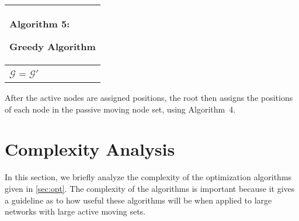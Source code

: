 \documentclass[10pt,conference]{IEEEtran}
\begin{document}
\begin{algorithm}[t]

\begin{tabular}[c]{p{8cm}}


\hline
{\scriptsize \begin{bf}Algorithm 5: \end{bf} Greedy Algorithm }\\
\hline

{\scriptsize
\KwIn{
Non-moving node subgraph, $\mathcal{G}'=
    \{\mathcal{V}',\mathcal{E}'\}$; active moving node set \AM;
    initial graph $\mathcal{G}_{i}$
}

\SetKwFunction{AN}{AttachNode}
\SetKwFunction{AT}{AggregateTraffic}

$\mathcal{G}$ = $\mathcal{G}'$\;

\While{$\AM  \neq \emptyset$}{
  $T_{\min}=\infty$\;
  \ForEach{$u \in \AM$} {

\ForEach{$v \in \mathcal{V}_{G}$}{

$\mathcal{G}_{tmp}$ = \AN{$u,v,\mathcal{G}$}\;
$T=$ \AT{$\mathcal{G}_{tmp}$}\;

\If{$ (\underset{\mathcal{G}_{i} \rightarrow \mathcal{G}_{tmp}}{d}(v)
  \leq h_{v}) \&\& (T < T_{\min})  $}
{
  $T_{\min}=T$\;
  $u_{\min}=u$\;
  $v_{\min}=v$\;
}


 }

 }

$\mathcal{G}$ = \AN{$u_{\min},v_{\min},\mathcal{G}$}\;
 $\AM = \AM \cap \overline{v_{\min}}$\;

}

}
\\
\hline


\end{tabular}

\end{algorithm}




After the active nodes are assigned positions, the root then assigns
the positions of each node in the passive moving node set, using
Algorithm~4.





\section{Complexity Analysis}
\label{sec:complex}

In this section, we briefly analyze the complexity of the optimization
algorithms given in \autoref{sec:opt}.  The complexity of the algorithms
is important because it gives a guideline as to how useful these
algorithms will be when applied to large networks with large active
moving sets.
\end{document}
